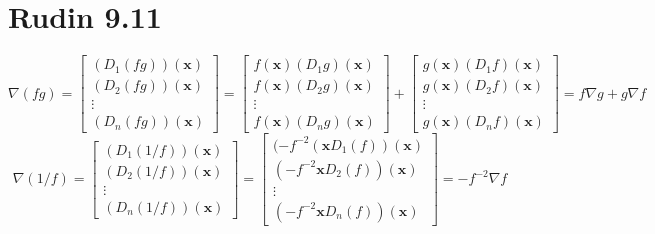 \documentclass{article}
\begin{document}
\section*{Rudin 9.11}
\[
  \nabla (fg) = 
  \begin{bmatrix}
    (D_1(fg))(\bm{x})\\ (D_2(fg))(\bm{x}) \\ \vdots \\(D_n(fg))(\bm{x})
  \end{bmatrix} =
  \begin{bmatrix}
    f(\bm{x})(D_1g)(\bm{x})\\ f(\bm{x})(D_2g)(\bm{x}) \\ \vdots \\f(\bm{x})(D_ng)(\bm{x})
  \end{bmatrix}
  + 
  \begin{bmatrix}
    g(\bm{x})(D_1f)(\bm{x})\\ g(\bm{x})(D_2f)(\bm{x}) \\ \vdots \\g(\bm{x})(D_nf)(\bm{x})
  \end{bmatrix} =
  f\nabla g + g\nabla f
\]
\[
  \nabla (1/f) =
  \begin{bmatrix}
    (D_1(1/f))(\bm{x})\\ (D_2(1/f))(\bm{x}) \\ \vdots \\(D_n(1/f))(\bm{x})
  \end{bmatrix} =
  \begin{bmatrix}
    (-f^{-2}(\bm{x}D_1(f))(\bm{x})\\ (-f^{-2}\bm{x}D_2(f))(\bm{x}) \\ \vdots \\(-f^{-2}\bm{x}D_n(f))(\bm{x})
  \end{bmatrix} =
  -f^{-2}\nabla f
\]
\end{document}
